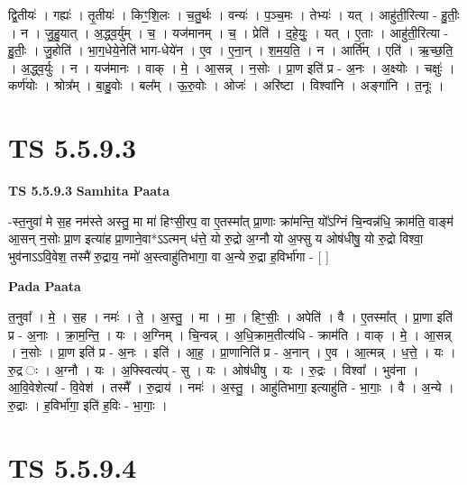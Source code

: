 \documentclass[17pt]{extarticle}
\begin{document}
द्वि॒तीयः॑ । गह्यः॑ । तृ॒तीयः॑ । किꣳ॒॒शि॒लः । च॒तु॒र्थः । वन्यः॑ । प॒ञ्च॒मः । तेभ्यः॑ । यत् । आहु॑ती॒रित्या - हु॒तीः॒ । न । जु॒हु॒यात् । अ॒द्ध्व॒र्युम् । च॒ । यज॑मानम् । च॒ । प्रेति॑ । द॒हे॒युः॒ । यत् । ए॒ताः । आहु॑ती॒रित्या - हु॒तीः॒ । जु॒होति॑ । भा॒ग॒धेये॒नेति॑ भाग-धेये॑न । ए॒व । ए॒ना॒न् । श॒म॒य॒ति॒ । न । आर्ति᳚म् । एति॑ । ऋ॒च्छ॒ति॒ । अ॒द्ध्व॒र्युः । न । यज॑मानः । वाक् । मे॒ । आ॒सन्न् । न॒सोः । प्रा॒ण इति॑ प्र - अ॒नः । अ॒क्ष्योः । चक्षुः॑ । कर्ण॑योः । श्रोत्र᳚म् । बा॒हु॒वोः । बल᳚म् । ऊ॒रु॒वोः । ओजः॑ । अरि॑ष्टा । विश्वा॑नि । अङ्गा॑नि । त॒नूः ।  \newline




\section*{ TS 5.5.9.3 }

\textbf{TS 5.5.9.3 } \newline
\textbf{Samhita Paata} \newline

-स्त॒नुवा॑ मे स॒ह नम॑स्ते अस्तु॒ मा मा॑ हिꣳसी॒रप॒ वा ए॒तस्मा᳚त् प्रा॒णाः क्रा॑मन्ति॒ यो᳚ऽग्निं चि॒न्वन्न॑धि॒ क्राम॑ति॒ वाङ्म॑ आ॒सन् न॒सोः प्रा॒ण इत्या॑ह प्रा॒णाने॒वा*ऽऽत्मन् ध॑त्ते॒ यो रु॒द्रो अ॒ग्नौ यो अ॒फ्सु य ओष॑धीषु॒ यो रु॒द्रो विश्वा॒ भुव॑नाऽऽवि॒वेश॒ तस्मै॑ रु॒द्राय॒ नमो॑ अ॒स्त्वाहु॑तिभागा॒ वा अ॒न्ये रु॒द्रा ह॒विर्भा॑गा - [  ] \newline

\textbf{Pada Paata} \newline

त॒नुवा᳚ । मे॒ । स॒ह । नमः॑ । ते॒ । अ॒स्तु॒ । मा । मा॒ । हिꣳ॒॒सीः॒ । अपेति॑ । वै । ए॒तस्मा᳚त् । प्रा॒णा इति॑ प्र - अ॒नाः । क्रा॒म॒न्ति॒ । यः । अ॒ग्निम् । चि॒न्वन्न् । अ॒धि॒क्राम॒तीत्य॑धि - क्राम॑ति । वाक् । मे॒ । आ॒सन्न् । न॒सोः । प्रा॒ण इति॑ प्र - अ॒नः । इति॑ । आ॒ह॒ । प्रा॒णानिति॑ प्र - अ॒नान् । ए॒व । आ॒त्मन्न् । ध॒त्ते॒ । यः । रु॒द्र ः । अ॒ग्नौ । यः । अ॒फ्स्वित्य॑प् - सु । यः । ओष॑धीषु । यः । रु॒द्रः । विश्वा᳚ । भुव॑ना । आ॒वि॒वेशेत्या᳚ - वि॒वेश॑ । तस्मै᳚ । रु॒द्राय॑ । नमः॑ । अ॒स्तु॒ । आहु॑तिभागा॒ इत्याहु॑ति - भा॒गाः॒ । वै । अ॒न्ये । रु॒द्राः । ह॒विर्भा॑गा॒ इति॑ ह॒विः - भा॒गाः॒ ।  \newline




\section*{ TS 5.5.9.4 }
\end{document}
